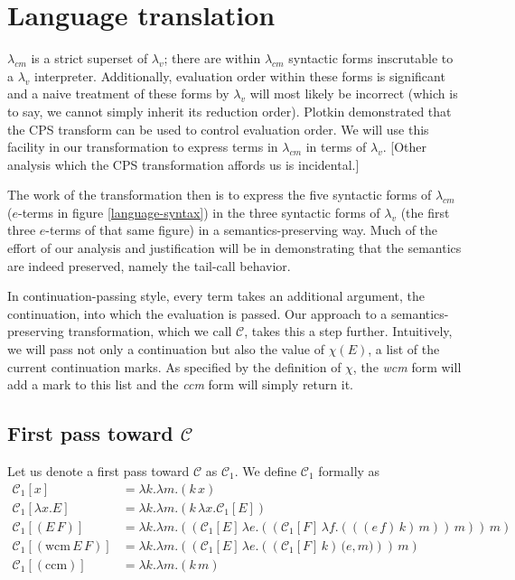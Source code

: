 \documentclass[ms,electronic,twosidetoc,letterpaper,chaptercenter,parttop]{byumsphd}
\begin{document}
\section{Language translation}

$\lambda_{cm}$ is a strict superset of $\lambda_{v}$; there are within $\lambda_{cm}$
syntactic forms inscrutable to a $\lambda_{v}$ interpreter. Additionally, evaluation order
within these forms is significant and a naive treatment of these forms by $\lambda_{v}$
will most likely be incorrect (which is to say, we cannot simply inherit its reduction
order). Plotkin \cite{plotkin1975call} demonstrated that the CPS transform can be used to
control evaluation order. We will use this facility in our transformation to express terms
in $\lambda_{cm}$ in terms of $\lambda_{v}$. [Other analysis which the CPS transformation
affords us \cite{appel2007compiling} is incidental.]

The work of the transformation then is to express the five syntactic forms of
$\lambda_{cm}$ ($e$-terms in figure \ref{language-syntax}) in the three syntactic forms of
$\lambda_{v}$ (the first three $e$-terms of that same figure) in a semantics-preserving
way. Much of the effort of our analysis and justification will be in demonstrating that
the semantics are indeed preserved, namely the tail-call behavior.

In continuation-passing style, every term takes an additional argument, the continuation,
into which the evaluation is passed. Our approach to a semantics-preserving
transformation, which we call $\mathcal{C}$, takes this a step further. Intuitively, we
will pass not only a continuation but also the value of $\chi(E)$, a list of the current 
continuation marks. As specified by the definition of $\chi$, the \emph{wcm} form will 
add a mark to this list and the \emph{ccm} form will simply return it.

\subsection{First pass toward $\mathcal{C}$}

Let us denote a first pass toward $\mathcal{C}$ as $\mathcal{C}_{1}$. We define 
$\mathcal{C}_{1}$ formally as 
\begin{align*}
\mathcal{C}_{1}[x]                      &= \lambda k.\lambda m.(k\,x)\\
\mathcal{C}_{1}[\lambda x.E]            &= \lambda k.\lambda m.(k\,\lambda x.\mathcal{C}_{1}[E])\\
\mathcal{C}_{1}[(E\,F)]                 &= \lambda k.\lambda m.((\mathcal{C}_{1}[E]\,\lambda e.((\mathcal{C}_{1}[F]\,\lambda f.(((e\,f)\,k)\,m))\,m))\,m)\\
\mathcal{C}_{1}[(\mathrm{wcm}\,E\,F)]   &= \lambda k.\lambda m.((\mathcal{C}_{1}[E]\,\lambda e.((\mathcal{C}_{1}[F]\,k)\,\mathbf{(}e\mathbf{,}m\mathbf{)}))\,m)\\
\mathcal{C}_{1}[(\mathrm{ccm})]         &= \lambda k.\lambda m.(k\,m)
\end{align*}
\end{document}
